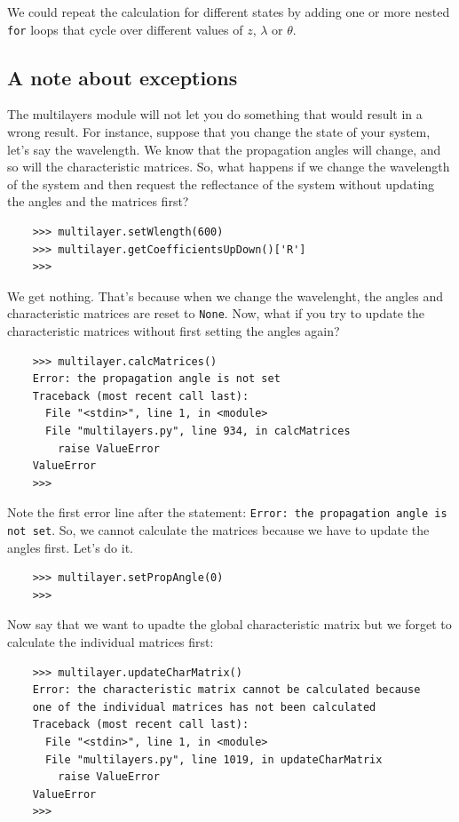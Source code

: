 \documentclass[a4paper,11pt,aps,final]{revtex4}
\begin{document}
We could repeat the calculation for different states by adding one or more nested \texttt{for} loops that cycle over different values of $z$, $\lambda$ or $\theta$.

\subsection{A note about exceptions}

The \textsf{multilayers} module will not let you do something that would result in a wrong result. For instance, suppose that you change the state of your system, let's say the wavelength. We know that the propagation angles will change, and so will the characteristic matrices. So, what happens if we change the wavelength of the system and then request the reflectance of the system without updating the angles and the matrices first?

\begin{verbatim}
    >>> multilayer.setWlength(600)
    >>> multilayer.getCoefficientsUpDown()['R']
    >>>
\end{verbatim}

We get nothing. That's because when we change the wavelenght, the angles and characteristic matrices are reset to \texttt{None}. Now, what if you try to update the characteristic matrices without first setting the angles again?

\begin{verbatim}
    >>> multilayer.calcMatrices()
    Error: the propagation angle is not set
    Traceback (most recent call last):
      File "<stdin>", line 1, in <module>
      File "multilayers.py", line 934, in calcMatrices
        raise ValueError
    ValueError
    >>>
\end{verbatim}

Note the first error line after the statement: \texttt{Error: the propagation angle is not set}. So, we cannot calculate the matrices because we have to update the angles first. Let's do it.

\begin{verbatim}
    >>> multilayer.setPropAngle(0)
    >>>
\end{verbatim}

Now say that we want to upadte the global characteristic matrix but we forget to calculate the individual matrices first:

\begin{verbatim}
    >>> multilayer.updateCharMatrix()
    Error: the characteristic matrix cannot be calculated because
    one of the individual matrices has not been calculated
    Traceback (most recent call last):
      File "<stdin>", line 1, in <module>
      File "multilayers.py", line 1019, in updateCharMatrix
        raise ValueError
    ValueError
    >>>
\end{verbatim}
\end{document}
